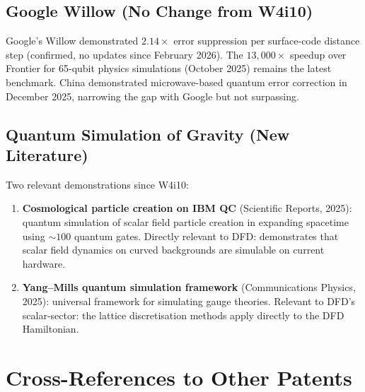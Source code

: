 \documentclass[11pt]{article}
\theoremstyle{definition}
\theoremstyle{remark}
\begin{document}
\subsection{Google Willow (No Change from W4i10)}

Google's Willow demonstrated $2.14\times$ error suppression per surface-code
distance step (confirmed, no updates since February 2026). The
$13{,}000\times$ speedup over Frontier for 65-qubit physics simulations
(October 2025) remains the latest benchmark. China demonstrated
microwave-based quantum error correction in December 2025, narrowing the
gap with Google but not surpassing.

\subsection{Quantum Simulation of Gravity (New Literature)}

Two relevant demonstrations since W4i10:
\begin{enumerate}[nosep]
\item \textbf{Cosmological particle creation on IBM QC} (Scientific Reports,
  2025): quantum simulation of scalar field particle creation in expanding
  spacetime using $\sim 100$ quantum gates. Directly relevant to DFD:
  demonstrates that scalar field dynamics on curved backgrounds are
  simulable on current hardware.
\item \textbf{Yang--Mills quantum simulation framework} (Communications
  Physics, 2025): universal framework for simulating gauge theories.
  Relevant to DFD's scalar-sector: the lattice discretisation methods
  apply directly to the DFD Hamiltonian.
\end{enumerate}

\section{Cross-References to Other Patents}
\label{sec:cross-references}
\end{document}
